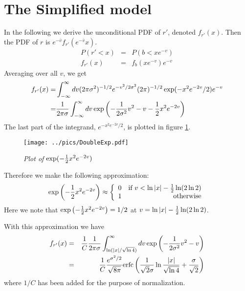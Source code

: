 \section{The Simplified model}\label{sec:SLV_Symmetric}
In the following we derive the unconditional PDF of $r'$, denoted
$f_{r'}(x)$. Then the PDF of $r$ is $e^{-\bar{v}}f_{r'}(e^{-\bar{v}}x)$.
\begin{eqnarray*}
  P(r' < x) &=& P(b < xe^{-v}) \\
  f_{r'}(x) &=& f_b(xe^{-v}) e^{-v}
\end{eqnarray*}
Averaging over all $v$, we get
\begin{equation}\label{eq:UncondPDFSymmetric}
  \begin{aligned}
    f_{r'}(x) =& \int_{-\infty}^{\infty} dv (2\pi\sigma^2)^{-1/2}
    e^{-v^2/2\sigma^2}(2\pi)^{-1/2} \exp(-x^2e^{-2v}/2) e^{-v} \\
    =& {1 \over 2\pi\sigma} \int_{-\infty}^{\infty} dv
    \exp\left(
      -{1 \over 2\sigma^2} v^2 - v -{1 \over 2} x^2 e^{-2v}
    \right)
  \end{aligned}
  \end{equation}
The last part of the integrand, $e^{-x^2 e^{-2v} / 2}$, is plotted in
figure \ref{fig:DoubleExp}.
\begin{figure}[htb!]
  \centering
  \texttt{[image: ../pics/DoubleExp.pdf]}
  \caption{\small \it Plot of $\exp(-{1 \over 2} x^2 e^{-2v})$}
  \label{fig:DoubleExp}
\end{figure}
Therefore we make the following approximation:
\[
\exp\left(-{1 \over 2} x^2 e^{-2v}\right) \approx \left\{
  \begin{array}{lr}
    0 & \text{if } v < \ln|x| -{1 \over 2} \ln(2\ln 2) \\
    1 & \text{otherwise}
  \end{array}
\right.
\]
Here we note that $\exp\left(-{1 \over 2} x^2 e^{-2v}\right) = 1/2$ at
$v = \ln|x| -{1 \over 2} \ln(2\ln 2)$.

With this approximation we have
\begin{eqnarray*}
  f_{r'}(x) &=& {1\over C}{1 \over 2\pi\sigma} \int_{\ln(|x|/\sqrt{\ln
      4})}^{\infty} dv
  \exp\left(-{1 \over 2\sigma^2} v^2 - v\right) \\
  &=& {1\over C}{e^{\sigma^2 / 2} \over \sqrt{8\pi}} \text{erfc} \left(
    {1 \over \sqrt{2}\sigma} \ln{|x| \over \sqrt{\ln 4}} + {\sigma
      \over \sqrt{2}}
  \right)
\end{eqnarray*}
where $1/C$ has been added for the purpose of normalization.

